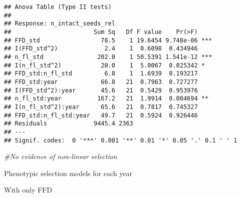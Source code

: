 \documentclass[]{article}
\newenvironment{Shaded}{\begin{snugshade}}{\end{snugshade}}
\newcommand{\CommentTok}[1]{\textcolor[rgb]{0.56,0.35,0.01}{\textit{#1}}}
\begin{document}
\begin{verbatim}
## Anova Table (Type II tests)
## 
## Response: n_intact_seeds_rel
##                       Sum Sq   Df F value    Pr(>F)    
## FFD_std                 78.5    1 19.6454 9.748e-06 ***
## I(FFD_std^2)             2.4    1  0.6098  0.434946    
## n_fl_std               202.0    1 50.5391 1.541e-12 ***
## I(n_fl_std^2)           20.0    1  5.0067  0.025342 *  
## FFD_std:n_fl_std         6.8    1  1.6939  0.193217    
## FFD_std:year            66.8   21  0.7963  0.727277    
## I(FFD_std^2):year       45.6   21  0.5429  0.953976    
## n_fl_std:year          167.2   21  1.9914  0.004694 ** 
## I(n_fl_std^2):year      65.6   21  0.7817  0.745327    
## FFD_std:n_fl_std:year   49.7   21  0.5924  0.926446    
## Residuals             9445.4 2363                      
## ---
## Signif. codes:  0 '***' 0.001 '**' 0.01 '*' 0.05 '.' 0.1 ' ' 1
\end{verbatim}

\begin{Shaded}
\begin{Highlighting}[]
\CommentTok{#No evidence of non-linear selection}
\end{Highlighting}
\end{Shaded}

Phenotypic selection models for each year

With only FFD
\end{document}
